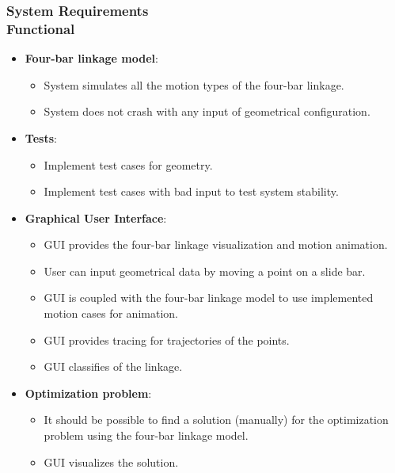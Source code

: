\documentclass[ucs,10pt]{beamer}
\begin{document}
\begin{frame}
	\frametitle{System Requirements \\
		\small \color{rwth-blue} Functional}
	\begin{itemize}
		\item \textbf{Four-bar linkage model}:
		\begin{itemize}
			\item System simulates all the motion types of the four-bar linkage.
			\item System does not crash with any input of geometrical configuration.
		\end{itemize}
		\item \textbf{Tests}:
		\begin{itemize}
			\item Implement test cases for geometry.
			\item Implement test cases with bad input to test system stability.
		\end{itemize}
		
		\item \textbf{Graphical User Interface}:
		\begin{itemize}
			\item GUI provides the four-bar linkage visualization and motion animation.
			\item User can input geometrical data by moving a point on a slide bar.
			\item GUI is coupled with the four-bar linkage model to use implemented motion cases for animation.
			\item GUI provides tracing for trajectories of the points.
			\item GUI classifies of the linkage.
		\end{itemize}
		\item \textbf{Optimization problem}:
		\begin{itemize}
			\item It should be possible to find a solution (manually) for the optimization problem using the four-bar linkage model.
			\item GUI visualizes the solution.
		\end{itemize}
	\end{itemize}
\end{frame}
\end{document}
